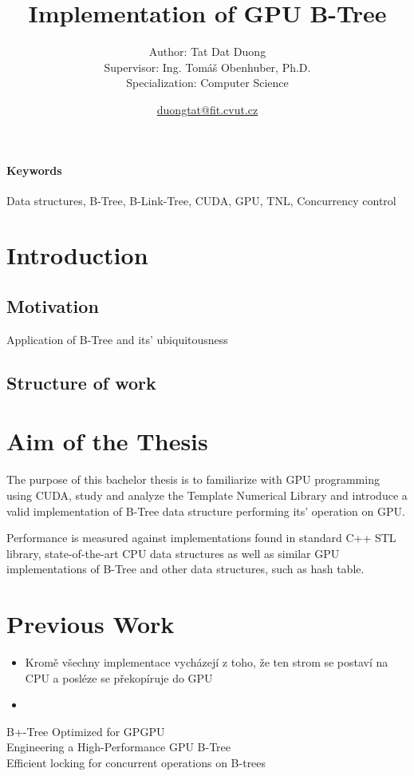 \documentclass{article}
\title{Implementation of GPU B-Tree} %
\author{
    \small Author: Tat Dat Duong\\
    \small Supervisor: Ing. Tomáš Obenhuber, Ph.D.\\
    \small Specialization: Computer Science
} %
\date{\small \url{duongtat@fit.cvut.cz}}
\begin{document}
\maketitle

\paragraph{Keywords}{Data structures, B-Tree, B-Link-Tree, CUDA, GPU, TNL, Concurrency control}

\section{Introduction}
\subsection{Motivation}

Application of B-Tree and its' ubiquitousness

\subsection{Structure of work}

\section{Aim of the Thesis}
The purpose of this bachelor thesis is to familiarize with GPU programming using CUDA, study and analyze the Template Numerical Library and introduce a valid implementation of B-Tree data structure performing its' operation on GPU.

Performance is measured against implementations found in standard C++ STL library, state-of-the-art CPU data structures as well as similar GPU implementations of B-Tree and other data structures, such as hash table.

\section{Previous Work}

\begin{itemize}
    \item Kromě \cite{awad} všechny implementace vycházejí z toho, že ten strom se postaví na CPU a posléze se překopíruje do GPU 
    \item 
\end{itemize}

B+-Tree Optimized for GPGPU \cite{kaczmarski} \\
Engineering a High-Performance GPU B-Tree \cite{awad} \\
Efficient locking for concurrent operations on B-trees \cite{lehman} \\
\end{document}
